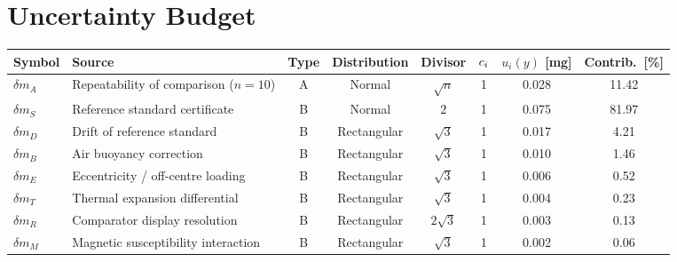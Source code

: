 \section{Uncertainty Budget}

\begingroup
\renewcommand{\arraystretch}{1.3}
\footnotesize
{}
\begin{tabularx}{\linewidth}{@{}l X c c c c S[table-format=1.3] S[table-format=2.2]@{}}
\toprule
{}
{\color{white}\bfseries Symbol} & {\color{white}\bfseries Source} &
{\color{white}\bfseries Type} & {\color{white}\bfseries Distribution} &
{\color{white}\bfseries Divisor} & {\color{white}\bfseries $c_i$} &
{\color{white}\bfseries $u_i(y)$ [mg]} & {\color{white}\bfseries Contrib.\ [\%]} \\
\midrule
$\delta m_A$ & Repeatability of comparison ($n=10$) & A & Normal & $\sqrt{n}$ & 1 & 0.028 & 11.42 \\
$\delta m_S$ & Reference standard certificate & B & Normal & $2$ & 1 & 0.075 & 81.97 \\
$\delta m_D$ & Drift of reference standard & B & Rectangular & $\sqrt{3}$ & 1 & 0.017 & 4.21 \\
$\delta m_B$ & Air buoyancy correction & B & Rectangular & $\sqrt{3}$ & 1 & 0.010 & 1.46 \\
$\delta m_E$ & Eccentricity / off-centre loading & B & Rectangular & $\sqrt{3}$ & 1 & 0.006 & 0.52 \\
$\delta m_T$ & Thermal expansion differential & B & Rectangular & $\sqrt{3}$ & 1 & 0.004 & 0.23 \\
$\delta m_R$ & Comparator display resolution & B & Rectangular & $2\sqrt{3}$ & 1 & 0.003 & 0.13 \\
$\delta m_M$ & Magnetic susceptibility interaction & B & Rectangular & $\sqrt{3}$ & 1 & 0.002 & 0.06 \\
\bottomrule
\end{tabularx}
\endgroup

\vspace{10pt}

